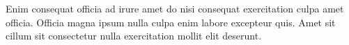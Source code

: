 \begin{dedication}

  Enim consequat officia ad irure amet do nisi consequat exercitation culpa amet officia. Officia magna ipsum nulla culpa enim labore excepteur quis. Amet sit cillum sit consectetur nulla exercitation mollit elit deserunt.

\end{dedication}
